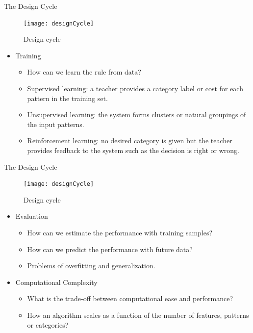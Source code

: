 \begin{frame}{The Design Cycle}
\begin{figure}
\texttt{[image: designCycle]}
\caption{Design cycle}
\end{figure}
\begin{itemize}
\item {\color{mycolor2}Training}
\begin{itemize}
\setlength{\itemsep}{3pt}
\item How can we learn the rule from data?
\item Supervised learning: a teacher provides a category label or
cost for each pattern in the training set.
\item Unsupervised learning: the system forms clusters or natural groupings of the input patterns.
\item Reinforcement learning: no desired category is given but the teacher provides feedback to the system such as the
decision is right or wrong.
\end{itemize}
\end{itemize}
\end{frame}

\begin{frame}{The Design Cycle}
\begin{figure}
\texttt{[image: designCycle]}
\caption{Design cycle}
\end{figure}
\vspace{-12pt}
\begin{itemize}
\setlength{\itemsep}{12pt}
\item {\color{mycolor2}Evaluation}
\begin{itemize}
\setlength{\itemsep}{2pt}
\item How can we estimate the performance with training
samples?
\item How can we predict the performance with future data?
\item Problems of overfitting and generalization.
\end{itemize}
\item {\color{mycolor2}Computational Complexity}
\begin{itemize}
\setlength{\itemsep}{2pt}
\item What is the trade-off between computational ease and performance?
\item How an algorithm scales as a function of the number of features, patterns or categories?
\end{itemize}
\end{itemize}
\end{frame}

